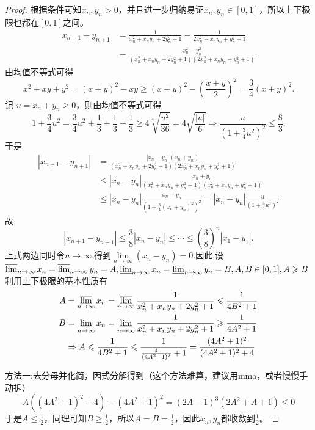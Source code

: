 \documentclass[../../main.tex]{subfiles}%
\begin{document}
\begin{proof}

根据条件可知\(x_n,y_n > 0\)，并且进一步归纳易证\(x_n,y_n\in[0,1]\)，所以上下极限也都在\([0,1]\)之间。
\begin{align*}
x_{n + 1}-y_{n + 1}&=\frac{1}{x_n^2 + x_ny_n + 2y_n^2 + 1}-\frac{1}{2x_n^2 + x_ny_n + y_n^2 + 1}\\
&=\frac{x_n^2 - y_n^2}{(x_n^2 + x_ny_n + 2y_n^2 + 1)(2x_n^2 + x_ny_n + y_n^2 + 1)}
\end{align*}
由均值不等式可得
\[
x^2 + xy + y^2=(x + y)^2 - xy\geqslant (x + y)^2 - \left(\frac{x + y}{2}\right)^2=\frac{3}{4}(x + y)^2.
\]
记 \(u = x_n + y_n\geqslant  0\)，则\hyperlink{均值放缩的思路}{由均值不等式可得}
\[
1+\frac{3}{4}u^2=\frac{3}{4}u^2+\frac{1}{3}+\frac{1}{3}+\frac{1}{3}\geqslant  4\sqrt[4]{\frac{u^2}{36}}=4\sqrt{\frac{|u|}{6}}\Rightarrow \frac{u}{(1+\frac{3}{4}u^2)^2}\leqslant \frac{8}{3}.
\]
于是
\begin{align*}
|x_{n + 1}-y_{n + 1}|&=\frac{|x_n - y_n|(x_n + y_n)}{(x_{n}^{2}+x_ny_n + 2y_{n}^{2}+1)(2x_{n}^{2}+x_ny_n + y_{n}^{2}+1)}\\
&\leqslant |x_n - y_n|\frac{x_n + y_n}{(x_{n}^{2}+x_ny_n + y_{n}^{2}+1)(x_{n}^{2}+x_ny_n + y_{n}^{2}+1)}\\
&\leqslant |x_n - y_n|\frac{x_n + y_n}{(1+\frac{3}{4}(x_n + y_n)^2)^2}=|x_n - y_n|\frac{u}{(1+\frac{3}{4}u^2)^2}
\end{align*}
故
\[
|x_{n + 1}-y_{n + 1}|\leqslant \frac{3}{8}|x_n - y_n|\leqslant \cdots \leqslant (\frac{3}{8})^n|x_1 - y_1|.
\]
上式两边同时令$n\to \infty$,得到$\underset{n\rightarrow \infty}{\lim}\left( x_n-y_n \right) =0$.因此,设
\(\varlimsup_{n\rightarrow\infty}x_n=\varlimsup_{n\rightarrow\infty}y_n = A,\varliminf_{n\rightarrow\infty}x_n=\varliminf_{n\rightarrow\infty}y_n = B,A,B\in[0,1],A\geqslant  B\)
利用上下极限的基本性质有
\begin{align*}
A&=\varlimsup_{n\rightarrow\infty}x_n=\varlimsup_{n\rightarrow\infty}\frac{1}{x_n^2 + x_ny_n + 2y_n^2 + 1}\leqslant \frac{1}{4B^2 + 1}\\
B&=\varliminf_{n\rightarrow\infty}x_n=\varliminf_{n\rightarrow\infty}\frac{1}{x_n^2 + x_ny_n + 2y_n^2 + 1}\geqslant \frac{1}{4A^2 + 1}\\
&\Rightarrow A\leqslant \frac{1}{4B^2 + 1}\leqslant \frac{1}{\frac{4}{(4A^2 + 1)^2}+1}=\frac{(4A^2 + 1)^2}{(4A^2 + 1)^2 + 4}
\end{align*}

{\color{blue}方法一:}去分母并化简，因式分解得到（这个方法难算，建议用mma，或者慢慢手动拆）
\[A((4A^2 + 1)^2 + 4)-(4A^2 + 1)^2=(2A - 1)^3(2A^2 + A + 1)\leqslant 0\]
于是\(A\leqslant \frac{1}{2}\)，同理可知\(B\geqslant \frac{1}{2}\)，所以\(A = B=\frac{1}{2}\)，因此\(x_n,y_n\)都收敛到\(\frac{1}{2}\)。


\end{proof}
\end{document}

